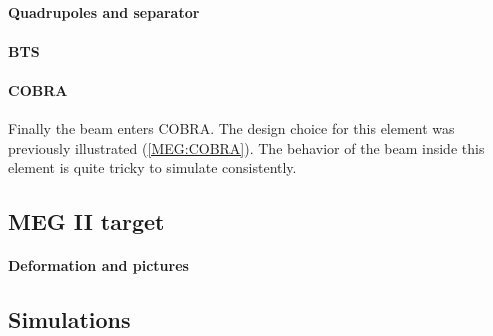 \begin{refsection}
        \paragraph{Quadrupoles and separator}
        \paragraph{BTS}
        \paragraph{COBRA} Finally the beam enters COBRA. 
        The design choice for this element was previously illustrated (\ref{MEG:COBRA}). 
        The behavior of the beam inside this element is quite tricky to simulate consistently.
        
    \subsection{MEG II target}
        \paragraph{Deformation and pictures}
        
    \subsection{Simulations}
        \paragraph{\gfb}

\end{refsection}
